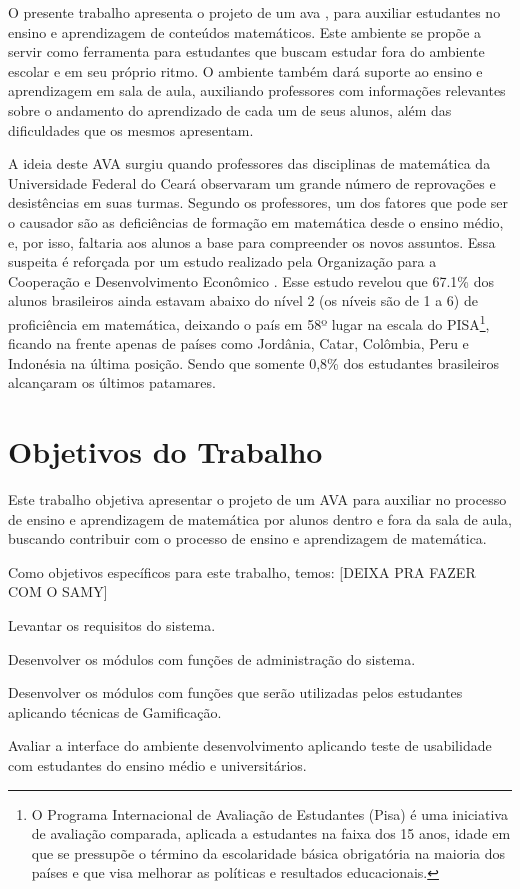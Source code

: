 O presente trabalho apresenta o projeto de um \gls{ava} \cite{valentini2010aprendizagem}, para auxiliar 
estudantes no ensino e aprendizagem de conteúdos matemáticos. Este ambiente se propõe a servir como ferramenta para estudantes que buscam 
estudar fora do ambiente escolar e em seu próprio ritmo. O ambiente também dará suporte ao ensino e aprendizagem em sala de aula, 
auxiliando professores com informações relevantes sobre o andamento do aprendizado de cada um de seus alunos, além das dificuldades que os 
mesmos apresentam.

A ideia deste AVA surgiu quando professores das disciplinas de matemática da Universidade Federal do Cear\'a observaram um grande número de 
reprovações e desistências em suas turmas. Segundo os professores, um dos fatores que pode ser o causador são as deficiências de formação em 
matemática desde o ensino médio, e, por isso, faltaria aos alunos a base para compreender os novos assuntos. Essa suspeita é reforçada por 
um estudo realizado pela Organização para a Cooperação e Desenvolvimento Econômico \cite{pisainfocus2016}. Esse estudo revelou que 67.1\% 
dos alunos brasileiros ainda estavam abaixo do nível 2 (os níveis são de 1 a 6) de proficiência em matem\'atica, deixando o país em 58º 
lugar 
na escala do PISA\footnote{O 
Programa Internacional de Avaliação de Estudantes (Pisa) é uma iniciativa de avaliação comparada, aplicada a estudantes na faixa dos 15 
anos, idade em que se pressupõe o término da escolaridade básica obrigatória na maioria dos países e que visa melhorar as políticas e 
resultados educacionais.}, ficando na frente apenas de países como Jordânia, Catar, Colômbia, Peru e Indonésia na \'ultima posi\c{c}\~ao. 
Sendo que somente 0,8\% dos estudantes brasileiros alcançaram os últimos patamares.

\section{Objetivos do Trabalho}

Este trabalho objetiva apresentar o projeto de um AVA para auxiliar no processo de ensino e aprendizagem de matemática por alunos dentro e 
fora da sala de aula, buscando contribuir com o processo de ensino e aprendizagem de matem\'atica. 

Como objetivos específicos para este trabalho, temos: 
[DEIXA PRA FAZER COM O SAMY]
\begin{alineas}
  \item Levantar os requisitos do sistema.
  \item Desenvolver os módulos com funções de administração do sistema.
  \item Desenvolver os módulos com funções que serão utilizadas pelos estudantes aplicando técnicas de Gamificação.
  \item Avaliar a interface do ambiente desenvolvimento aplicando teste de usabilidade com estudantes do ensino m\'edio e universit\'arios.
\end{alineas}


